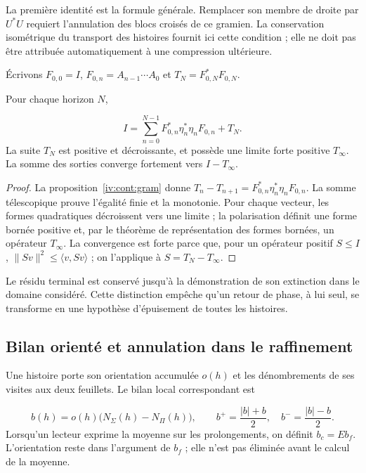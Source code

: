 La première identité est la formule générale. Remplacer son membre de droite par \(U^*U\) requiert l'annulation des blocs croisés de ce gramien. La conservation isométrique du transport des histoires fournit ici cette condition ; elle ne doit pas être attribuée automatiquement à une compression ultérieure.

Écrivons \(F_{0,0}=I\), \(F_{0,n}=A_{n-1}\cdots A_0\) et \(T_N=F_{0,N}^*F_{0,N}\).

\begin{theorem}
\label{iv:cont:terminal}
Pour chaque horizon \(N\),

\[
I=\sum_{n=0}^{N-1}
F_{0,n}^*\eta_n^*\eta_nF_{0,n}+T_N.
\]
La suite \(T_N\) est positive et décroissante, et possède une limite forte positive \(T_\infty\). La somme des sorties converge fortement vers \(I-T_\infty\).

\end{theorem}
\begin{proof}
La proposition~\ref{iv:cont:gram} donne \(T_n-T_{n+1}=F_{0,n}^*\eta_n^*\eta_nF_{0,n}\). La somme télescopique prouve l'égalité finie et la monotonie. Pour chaque vecteur, les formes quadratiques décroissent vers une limite ; la polarisation définit une forme bornée positive et, par le théorème de représentation des formes bornées, un opérateur \(T_\infty\). La convergence est forte parce que, pour un opérateur positif \(S\leq I\), \(\|Sv\|^2\leq\langle v,Sv\rangle\) ; on l'applique à \(S=T_N-T_\infty\).
\end{proof}

Le résidu terminal est conservé jusqu'à la démonstration de son extinction dans le domaine considéré. Cette distinction empêche qu'un retour de phase, à lui seul, se transforme en une hypothèse d'épuisement de toutes les histoires.

\subsection{Bilan orienté et annulation dans le raffinement}
\label{iv:cont:balance}
Une histoire porte son orientation accumulée \(o(h)\) et les dénombrements de ses visites aux deux feuillets. Le bilan local correspondant est

\[
b(h)=o(h)\bigl(N_\Sigma(h)-N_\Pi(h)\bigr),
\qquad
b^+=\frac{|b|+b}{2},\quad b^-=\frac{|b|-b}{2}.
\]
Lorsqu’un lecteur exprime la moyenne sur les prolongements, on définit \(b_c=Eb_f\). L’orientation reste dans l’argument de \(b_f\) ; elle n’est pas éliminée avant le calcul de la moyenne.

